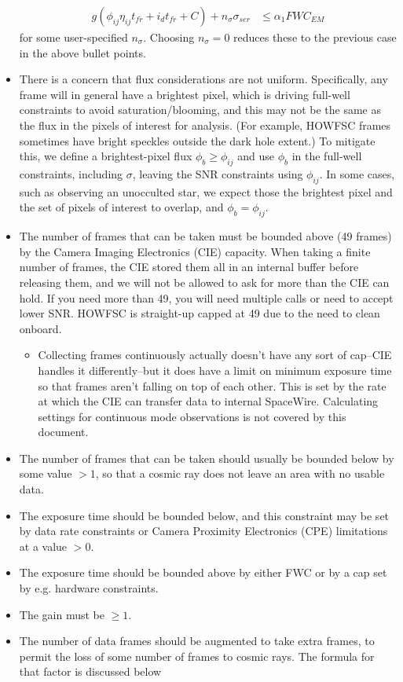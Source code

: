 \documentclass{article}
\begin{document}
\begin{itemize}
\begin{align}
g(\phi_{ij} \eta_{ij} t_{fr} + i_{d} t_{fr} + C) + n_{\sigma} \sigma_{ser} &\leq \alpha_{1} FWC_{EM}
\end{align}
for some user-specified $n_{\sigma}$.  Choosing $n_{\sigma} = 0$ reduces these to the previous case in the above bullet points.
\item There is a concern that flux considerations are not uniform.  Specifically, any frame will in general have a brightest pixel, which is driving full-well constraints to avoid saturation/blooming, and this may not be the same as the flux in the pixels of interest for analysis.  (For example, HOWFSC frames sometimes have bright speckles outside the dark hole extent.)  To mitigate this, we define a brightest-pixel flux $\phi_{b} \geq \phi_{ij}$ and use $\phi_{b}$ in the full-well constraints, including $\sigma$, leaving the SNR constraints using $\phi_{ij}$. In some cases, such as observing an unocculted star, we expect those the brightest pixel and the set of pixels of interest to overlap, and $\phi_{b} = \phi_{ij}$.
\item The number of frames that can be taken must be bounded above (49 frames) by the Camera Imaging Electronics (CIE) capacity.  When taking a finite number of frames, the CIE stored them all in an internal buffer before releasing them, and we will not be allowed to ask for more than the CIE can hold. If you need more than 49, you will need multiple calls or need to accept lower SNR.  HOWFSC is straight-up capped at 49 due to the need to clean onboard.
\begin{itemize}
\item Collecting frames continuously actually doesn't have any sort of cap--CIE handles it differently--but it does have a limit on minimum exposure time so that frames aren't falling on top of each other.  This is set by the rate at which the CIE can transfer data to internal SpaceWire.  Calculating settings for continuous mode observations is not covered by this document.
\end{itemize}
\item The number of frames that can be taken should usually be bounded below by some value $> 1$, so that a cosmic ray does not leave an area with no usable data.
\item The exposure time should be bounded below, and this constraint may be set by data rate constraints or Camera Proximity Electronics (CPE) limitations at a value $> 0$.
\item The exposure time should be bounded above by either FWC or by a cap set by e.g. hardware constraints.
\item The gain must be $\geq 1$.
\item The number of data frames should be augmented to take extra frames, to permit the loss of some number of frames to cosmic rays.  The formula for that factor is discussed below
\end{itemize}
\end{document}
